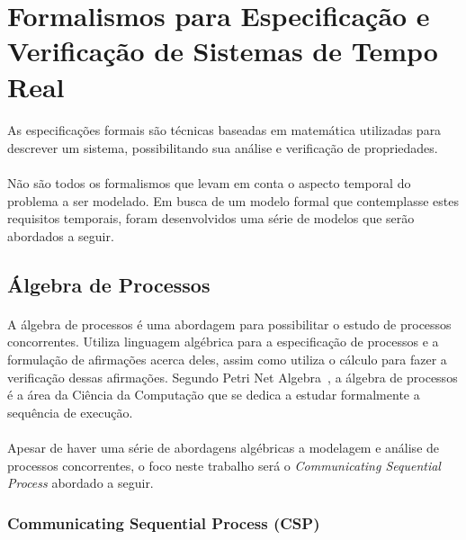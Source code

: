 \section{Formalismos para Especificação e Verificação de Sistemas de Tempo Real}
\paragraph{}
As especificações formais são técnicas baseadas em matemática utilizadas para descrever um sistema,
possibilitando sua análise e verificação de propriedades.
\paragraph{}
Não são todos os formalismos que levam em conta o aspecto temporal do problema a ser modelado.
Em busca de um modelo formal que contemplasse estes requisitos temporais, foram desenvolvidos uma série
de modelos que serão abordados a seguir.

\subsection{Álgebra de Processos}
\paragraph{}
A álgebra de processos é uma abordagem para possibilitar o estudo de processos concorrentes. Utiliza linguagem algébrica
para a especificação de processos e a formulação de afirmações acerca deles, assim como utiliza o cálculo para fazer a
verificação dessas afirmações. Segundo Petri Net Algebra~\cite{books/daglib/0003970}, a álgebra de processos é a área da
Ciência da Computação que se dedica a estudar formalmente a sequência de execução.
\paragraph{}
Apesar de haver uma série de abordagens algébricas a modelagem e análise de processos concorrentes, o foco neste trabalho
será o \textit{Communicating Sequential Process} abordado a seguir.

\subsubsection{Communicating Sequential Process (CSP)}
\paragraph{}
\lipsum[1]

